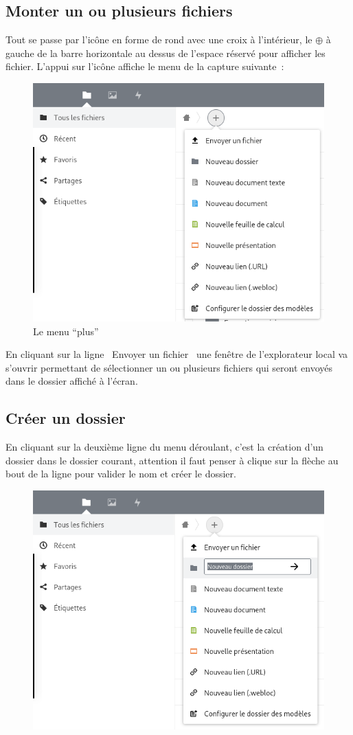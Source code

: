 \subsection{Monter un ou plusieurs fichiers}
Tout se passe par l'icône en forme de rond avec une croix à l'intérieur, le {\Large $\oplus$} à gauche de la barre horizontale au dessus de l'espace réservé pour afficher les fichier. L'appui sur l'icône affiche le menu de la capture suivante~:
\begin{figure}
	\centering
	\includegraphics[width=0.5000\linewidth]{./Captures/nuage.menu.plus.png}
	\caption{Le menu ``plus''}
\end{figure}
En cliquant sur la ligne \og~Envoyer un fichier~\fg{} une fenêtre de l'explorateur local va s'ouvrir permettant de sélectionner un ou plusieurs fichiers qui seront envoyés dans le dossier affiché à l'écran.

\subsection{Créer un dossier}
En cliquant sur la deuxième ligne du menu déroulant, c'est la création d'un dossier dans le dossier courant, attention il faut penser à clique sur la flèche au bout de la ligne pour valider le nom et créer le dossier.
\begin{figure}
	\centering
	\includegraphics[width=0.5000\linewidth]{./Captures/nuage.menu.plus.creer.dossier.png}
	\caption{}
\end{figure}

